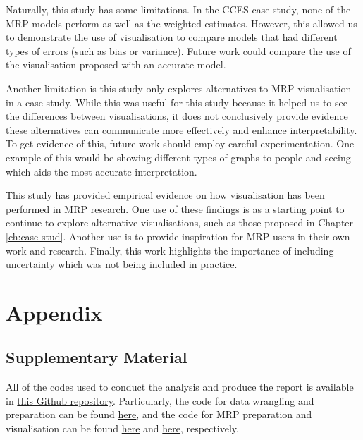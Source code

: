 \documentclass{monashthesis}
\begin{document}
Naturally, this study has some limitations. In the CCES case study, none of the MRP models perform as well as the weighted estimates. However, this allowed us to demonstrate the use of visualisation to compare models that had different types of errors (such as bias or variance). Future work could compare the use of the visualisation proposed with an accurate model.

Another limitation is this study only explores alternatives to MRP visualisation in a case study. While this was useful for this study because it helped us to see the differences between visualisations, it does not conclusively provide evidence these alternatives can communicate more effectively and enhance interpretability. To get evidence of this, future work should employ careful experimentation. One example of this would be showing different types of graphs to people and seeing which aids the most accurate interpretation.

This study has provided empirical evidence on how visualisation has been performed in MRP research. One use of these findings is as a starting point to continue to explore alternative visualisations, such as those proposed in Chapter \ref{ch:case-stud}. Another use is to provide inspiration for MRP users in their own work and research. Finally, this work highlights the importance of including uncertainty which was not being included in practice.

\appendix

\hypertarget{appendix}{%
\chapter{Appendix}\label{appendix}}

\hypertarget{supplementary-material}{%
\section{Supplementary Material}\label{supplementary-material}}

All of the codes used to conduct the analysis and produce the report is available in \href{https://github.com/Dewi-Amaliah/MRP_diagnostic_plot}{this Github repository}. Particularly, the code for data wrangling and preparation can be found \href{https://github.com/Dewi-Amaliah/MRP_diagnostic_plot/blob/main/case_study/analysis/cces_acs_wrangling.Rmd}{here}, and the code for MRP preparation and visualisation can be found \href{https://github.com/Dewi-Amaliah/MRP_diagnostic_plot/blob/main/case_study/analysis/mrp_fitting.R}{here} and \href{https://github.com/Dewi-Amaliah/MRP_diagnostic_plot/blob/main/case_study/analysis/mrp_vis.R}{here}, respectively.
\end{document}

